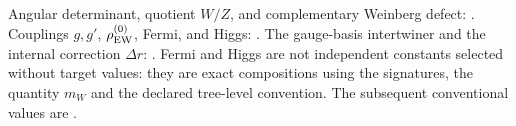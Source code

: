 \begin{statusbox}
Angular determinant, quotient \(W/Z\), and complementary Weinberg defect:
. Couplings \(g,g'\),
\(\rho_{\rm EW}^{(0)}\), Fermi, and Higgs: . The gauge-basis intertwiner and the
internal correction \(\Delta r\): . Fermi and Higgs are not independent constants selected without target values: they are exact compositions using the signatures, the quantity \(m_W\) and the declared tree-level convention. The subsequent conventional values are .
\end{statusbox}

